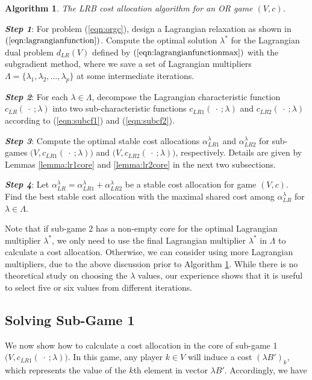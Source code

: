 \documentclass[ijoc,nonblindrev]{informs3} %
\newtheorem{algorithm}{Algorithm}
\begin{document}
\begin{algorithm}\label{algolrb}
The LRB cost allocation algorithm for an OR game $(V,c)$.
\end{algorithm}

\textbf{{\em Step 1}}: For problem (\ref{eqn:orgc}), design a Lagrangian relaxation as shown in $(\ref{eqn:lagrangianfunction})$. Compute the optimal solution $\lambda^*$ for the Lagrangian dual problem $d_{LR}(V)$ defined by $(\ref{eqn:lagrangianfunctionmax})$ with the subgradient method, where we  save a set of Lagrangian multipliers $\Lambda=\{\lambda_1,\lambda_2,\ldots,\lambda_p\}$ at some intermediate iterations.

\textbf{{\em Step 2}}: For each  $\lambda\in\Lambda$, decompose the Lagrangian characteristic function $c_{LR}(\ \cdot \ ;\lambda)$ into two sub-characteristic functions $c_{LR1}(\ \cdot \ ;\lambda)$ and $c_{LR2}(\ \cdot \ ;\lambda)$ according to (\ref{eqn:subcf1}) and (\ref{eqn:subcf2}).

\textbf{{\em Step 3}}: Compute the optimal stable cost allocations $\alpha_{LR1}^{\lambda}$ and $\alpha_{LR2}^{\lambda}$ for  sub-games $\big(V,c_{LR1}(\ \cdot \ ;\lambda)\big)$ and $\big(V,c_{LR2}(\ \cdot \ ;\lambda)\big)$, respectively. Details are given by Lemmas \ref{lemma:lr1core} and \ref{lemma:lr2core} in the next two subsections.

\textbf{{\em Step 4}}: Let $\alpha_{LR}^{\lambda} = \alpha_{LR1}^{\lambda} + \alpha_{LR2}^{\lambda}$ be a stable cost allocation for game $ (V,c)$. Find the best stable cost allocation  with the maximal shared cost among $\alpha_{LR}^{\lambda}$ for  $\lambda\in\Lambda$.

Note that if sub-game 2 has a non-empty core for the optimal Lagrangian multiplier $\lambda^*$,  we only need to use the final Lagrangian multiplier $\lambda^*$ in $\Lambda$ to calculate a cost allocation.
Otherwise, we can consider using more Lagrangian multipliers, due to the above discussion prior to Algorithm \ref{algolrb}. While there is no theoretical study on choosing the $\lambda$ values, our experience shows that it is useful to select five or six values from different iterations.


\subsection{Solving Sub-Game 1}
We now show how to calculate a cost allocation in the core of sub-game 1 $\big(V,c_{LR1}(\ \cdot\ ;\lambda)\big)$.
In this game, any player $k \in V $ will induce a cost $(\lambda B')_k$, which represents the value of the $k$th element in vector $\lambda B'$. Accordingly, we have
\end{document}
